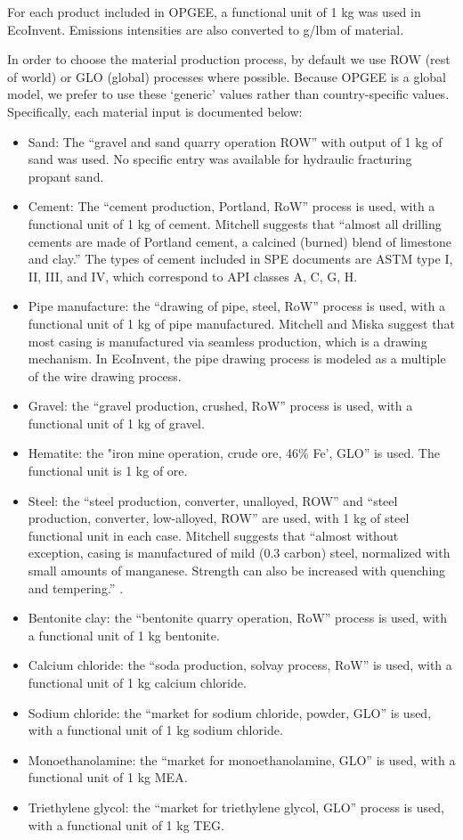 \documentclass[11pt]{report}
\begin{document}
{{{{For each product included in OPGEE, a functional unit of 1 kg was used in EcoInvent. Emissions intensities are also converted to g/lbm of material.

In order to choose the material production process, by default we use ROW (rest of world) or GLO (global) processes where possible. Because OPGEE is a global model, we prefer to use these `generic' values rather than country-specific values. Specifically, each material input is documented below:
\begin{itemize}
\item Sand: The ``gravel and sand quarry operation ROW'' with output of 1 kg of sand was used. No specific entry was available for hydraulic fracturing propant sand.
\item Cement: The ``cement production, Portland, RoW'' process is used, with a functional unit of 1 kg of cement. Mitchell suggests \cite[p. 382]{Mitchell2006} that ``almost all drilling cements are made of Portland cement, a calcined (burned) blend of limestone and clay.'' The types of cement included in SPE documents are ASTM type I, II, III, and IV, which correspond to API classes A, C, G, H.
\item Pipe manufacture: the ``drawing of pipe, steel, RoW'' process is used, with a functional unit of 1 kg of pipe manufactured. Mitchell and Miska \cite[p. 387]{Mitchell2011} suggest that most casing is manufactured via seamless production, which is a drawing mechanism. In EcoInvent, the pipe drawing process is modeled as a multiple of the wire drawing process.
\item Gravel: the ``gravel production, crushed, RoW'' process is used, with a functional unit of 1 kg of gravel.
\item Hematite: the "iron mine operation, crude ore, 46\% Fe', GLO'' is used. The functional unit is 1 kg of ore.
\item Steel: the ``steel production, converter, unalloyed, ROW'' and ``steel production, converter, low-alloyed, ROW'' are used, with 1 kg of steel functional unit in each case. Mitchell suggests that ``almost without exception, casing is manufactured of mild (0.3 carbon) steel, normalized with small amounts of manganese. Strength can also be increased with quenching and tempering.'' \cite[p. 288]{Mitchell2006}.
\item Bentonite clay: the ``bentonite quarry operation, RoW'' process is used, with a functional unit of 1 kg bentonite.
\item Calcium chloride: the ``soda production, solvay process, RoW'' is used, with a functional unit of 1 kg calcium chloride.
\item Sodium chloride: the ``market for sodium chloride, powder, GLO'' is used, with a functional unit of 1 kg sodium chloride.
\item Monoethanolamine: the ``market for monoethanolamine, GLO'' is used, with a functional unit of 1 kg MEA.
\item Triethylene glycol: the ``market for triethylene glycol, GLO'' process is used, with a functional unit of 1 kg TEG.
\end{itemize}

}}}}
\end{document}
